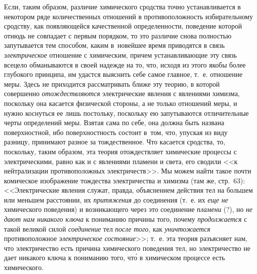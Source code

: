Если, таким образом, различие химического сродства точно устанавливается в
некотором ряде количественных отношений в противоположность избирательному
сродству, как появляющейся качественной определенности, поведение которой отнюдь не совпадает с первым
порядком, то это различие снова полностью запутывается тем способом, каким
в~новейшее время приводятся в связь {\em электрическое} отношение с химическим,
причем устанавливающие эту связь всецело обманываются в своей надежде на то,
что, исходя из этого якобы более глубокого принципа, им удастся выяснить себе
самое главное, т.~е. отношение меры. Здесь не приходится рассматривать ближе
эту теорию, в которой совершенно {\em отождествляются} электрические явления с
явлениями химизма, поскольку она касается физической стороны, а не только
отношений меры, и нужно коснуться ее лишь постольку, поскольку ею запутываются
отличительные черты определений меры. Взятая сама по себе, она должна быть
названа поверхностной, ибо поверхностность состоит в~том, что, упуская из виду
разницу, принимают разное за тождественное. Что касается сродства, то,
поскольку, таким образом, эта теория отождествляет химические процессы с
электрическими, равно как и с явлениями пламени и света, его сводили <<к
нейтрализации противоположных электричеств>>. Мы можем найти такое почти
комическое изображение тождества электричества и химизма (там же, стр.~63):
<<Электрические явления служат, правда, объяснением действия тел на большем или
меньшем расстоянии, их {\em притяжения} до соединения (т.~е. их {\em еще не}
химического поведения) и возникающего через это соединение {\em пламени} (?),
но {\em не дают нам никакого ключа} к пониманию причины того, почему
{\em продолжается} с такой великой силой {\em соединение} тел {\em после того},
как {\em уничтожается} противоположное {\em электрическое состояние}>>; т.~е.
эта теория разъясняет нам, что электричество есть причина химического поведения
тел, но электричество не дает никакого ключа к пониманию того, чт\'{о}
в химическом процессе есть химического.

